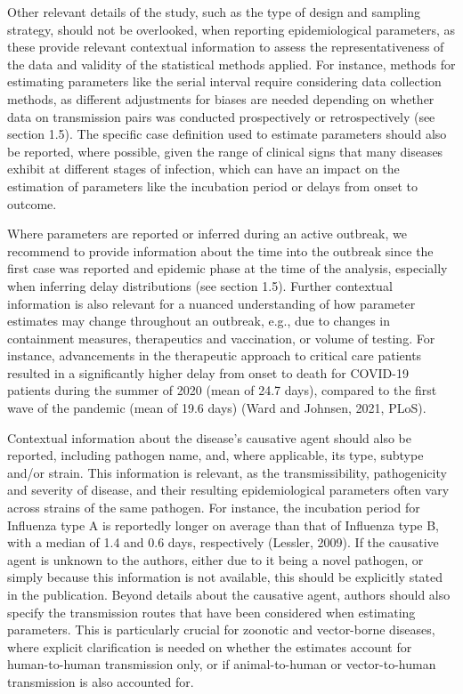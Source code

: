\documentclass[
  10pt,
  letterpaper,
]{article}
\begin{document}
Other relevant details of the study, such as the type of design and
sampling strategy, should not be overlooked, when reporting
epidemiological parameters, as these provide relevant contextual
information to assess the representativeness of the data and validity of
the statistical methods applied. For instance, methods for estimating
parameters like the serial interval require considering data collection
methods, as different adjustments for biases are needed depending on
whether data on transmission pairs was conducted prospectively or
retrospectively (see section 1.5). The specific case definition used to
estimate parameters should also be reported, where possible, given the
range of clinical signs that many diseases exhibit at different stages
of infection, which can have an impact on the estimation of parameters
like the incubation period or delays from onset to outcome.

Where parameters are reported or inferred during an active outbreak, we
recommend to provide information about the time into the outbreak since
the first case was reported and epidemic phase at the time of the
analysis, especially when inferring delay distributions (see section
1.5). Further contextual information is also relevant for a nuanced
understanding of how parameter estimates may change throughout an
outbreak, e.g., due to changes in containment measures, therapeutics and
vaccination, or volume of testing. For instance, advancements in the
therapeutic approach to critical care patients resulted in a
significantly higher delay from onset to death for COVID-19 patients
during the summer of 2020 (mean of 24.7 days), compared to the first
wave of the pandemic (mean of 19.6 days) (Ward and Johnsen, 2021, PLoS).

Contextual information about the disease's causative agent should also
be reported, including pathogen name, and, where applicable, its type,
subtype and/or strain. This information is relevant, as the
transmissibility, pathogenicity and severity of disease, and their
resulting epidemiological parameters often vary across strains of the
same pathogen. For instance, the incubation period for Influenza type A
is reportedly longer on average than that of Influenza type B, with a
median of 1.4 and 0.6 days, respectively (Lessler, 2009). If the
causative agent is unknown to the authors, either due to it being a
novel pathogen, or simply because this information is not available,
this should be explicitly stated in the publication. Beyond details
about the causative agent, authors should also specify the transmission
routes that have been considered when estimating parameters. This is
particularly crucial for zoonotic and vector-borne diseases, where
explicit clarification is needed on whether the estimates account for
human-to-human transmission only, or if animal-to-human or
vector-to-human transmission is also accounted for.
\end{document}
